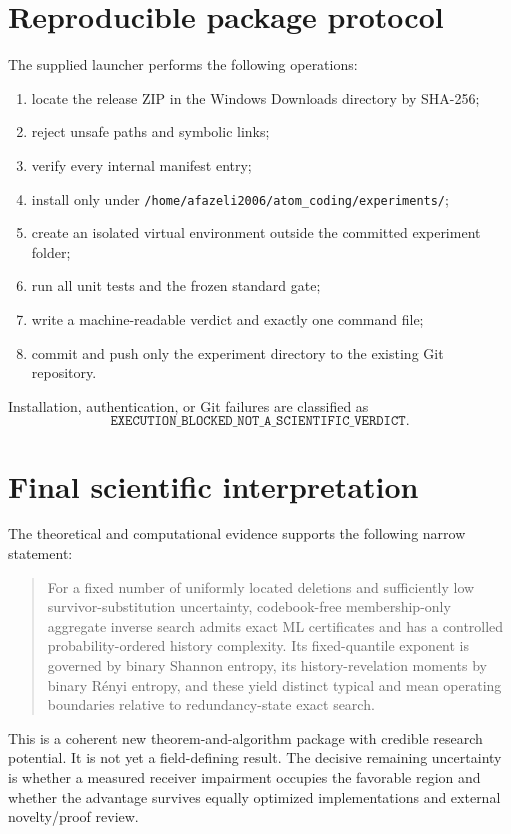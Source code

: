 \documentclass[11pt]{article}
\theoremstyle{definition}
\theoremstyle{remark}
\begin{document}
\section{Reproducible package protocol}
The supplied launcher performs the following operations:
\begin{enumerate}[leftmargin=2em]
\item locate the release ZIP in the Windows Downloads directory by SHA-256;
\item reject unsafe paths and symbolic links;
\item verify every internal manifest entry;
\item install only under \texttt{/home/afazeli2006/atom\_coding/experiments/};
\item create an isolated virtual environment outside the committed experiment folder;
\item run all unit tests and the frozen standard gate;
\item write a machine-readable verdict and exactly one command file;
\item commit and push only the experiment directory to the existing Git repository.
\end{enumerate}
Installation, authentication, or Git failures are classified as
\[
\texttt{EXECUTION\_BLOCKED\_NOT\_A\_SCIENTIFIC\_VERDICT}.
\]

\section{Final scientific interpretation}
The theoretical and computational evidence supports the following narrow statement:
\begin{quote}
For a fixed number of uniformly located deletions and sufficiently low survivor-substitution uncertainty, codebook-free membership-only aggregate inverse search admits exact ML certificates and has a controlled probability-ordered history complexity.  Its fixed-quantile exponent is governed by binary Shannon entropy, its history-revelation moments by binary R\'enyi entropy, and these yield distinct typical and mean operating boundaries relative to redundancy-state exact search.
\end{quote}
This is a coherent new theorem-and-algorithm package with credible research potential.  It is not yet a field-defining result.  The decisive remaining uncertainty is whether a measured receiver impairment occupies the favorable region and whether the advantage survives equally optimized implementations and external novelty/proof review.
\end{document}
